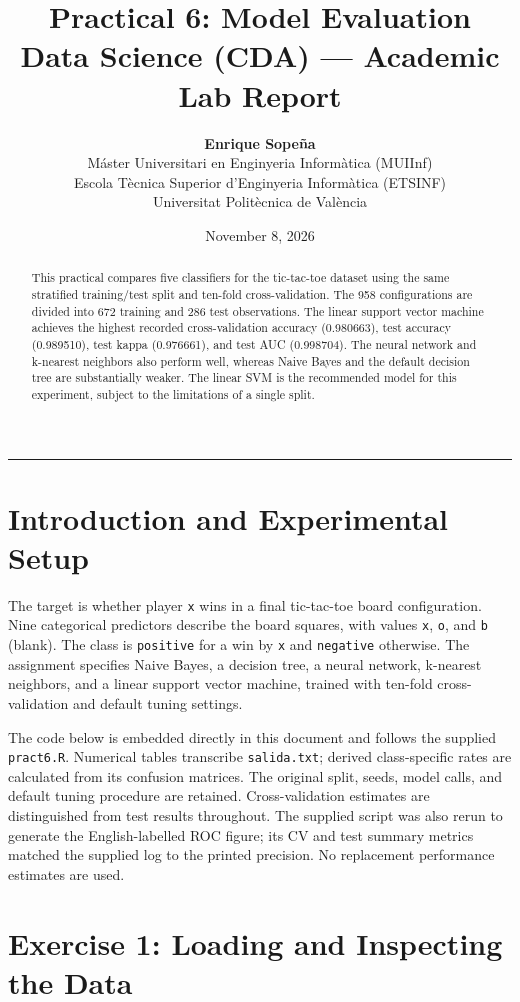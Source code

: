 \documentclass[11pt,a4paper]{article}
\title{\textbf{Practical 6: Model Evaluation}\\[0.4ex] \Large Data Science (CDA) --- Academic Lab Report}
\author{\textbf{Enrique Sopeña} \\ 
Máster Universitari en Enginyeria Informàtica (MUIInf) \\
Escola Tècnica Superior d'Enginyeria Informàtica (ETSINF) \\ 
Universitat Politècnica de València}
\date{November 8, 2026}
\begin{document}
\maketitle
\begin{abstract}
    This practical compares five classifiers for the tic-tac-toe dataset using the same stratified training/test split and ten-fold cross-validation. The 958 configurations are divided into 672 training and 286 test observations. The linear support vector machine achieves the highest recorded cross-validation accuracy (0.980663), test accuracy (0.989510), test kappa (0.976661), and test AUC (0.998704). The neural network and k-nearest neighbors also perform well, whereas Naive Bayes and the default decision tree are substantially weaker. The linear SVM is the recommended model for this experiment, subject to the limitations of a single split.
\end{abstract}
\vspace{0.8em}\hrule\vspace{1em}
\section{Introduction and Experimental Setup}
The target is whether player \texttt{x} wins in a final tic-tac-toe board configuration. Nine categorical predictors describe the board squares, with values \texttt{x}, \texttt{o}, and \texttt{b} (blank). The class is \texttt{positive} for a win by \texttt{x} and \texttt{negative} otherwise. The assignment specifies Naive Bayes, a decision tree, a neural network, k-nearest neighbors, and a linear support vector machine, trained with ten-fold cross-validation and default tuning settings.

The code below is embedded directly in this document and follows the supplied \texttt{pract6.R}. Numerical tables transcribe \texttt{salida.txt}; derived class-specific rates are calculated from its confusion matrices. The original split, seeds, model calls, and default tuning procedure are retained. Cross-validation estimates are distinguished from test results throughout. The supplied script was also rerun to generate the English-labelled ROC figure; its CV and test summary metrics matched the supplied log to the printed precision. No replacement performance estimates are used.

\section{Exercise 1: Loading and Inspecting the Data}
\end{document}
